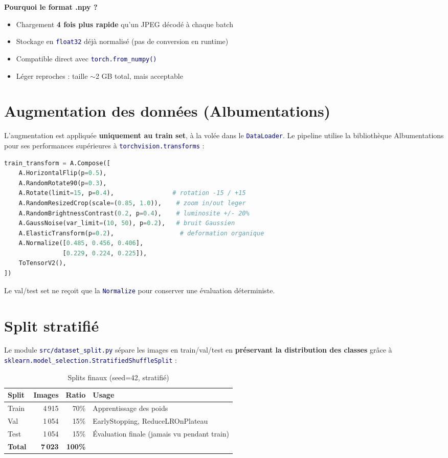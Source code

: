\documentclass[11pt,a4paper,oneside]{report}
\newcommand{\code}[1]{\texttt{\textcolor{navy}{#1}}}
\begin{document}
\textbf{Pourquoi le format .npy ?}
\begin{itemize}
\item Chargement \textbf{4 fois plus rapide} qu'un JPEG décodé à chaque batch
\item Stockage en \code{float32} déjà normalisé (pas de conversion en runtime)
\item Compatible direct avec \code{torch.from\_numpy()}
\item Léger reproches : taille $\sim$2 GB total, mais acceptable
\end{itemize}

\section{Augmentation des données (Albumentations)}

L'augmentation est appliquée \textbf{uniquement au train set}, à la volée dans le \code{DataLoader}. Le pipeline utilise la bibliothèque Albumentations pour ses performances supérieures à \code{torchvision.transforms} :

\begin{lstlisting}[language=Python, caption={Pipeline d'augmentation Albumentations}]
train_transform = A.Compose([
    A.HorizontalFlip(p=0.5),
    A.RandomRotate90(p=0.3),
    A.Rotate(limit=15, p=0.4),                # rotation -15 / +15
    A.RandomResizedCrop(scale=(0.85, 1.0)),    # zoom in/out leger
    A.RandomBrightnessContrast(0.2, p=0.4),    # luminosite +/- 20%
    A.GaussNoise(var_limit=(10, 50), p=0.2),   # bruit Gaussien
    A.ElasticTransform(p=0.2),                  # deformation organique
    A.Normalize([0.485, 0.456, 0.406],
                [0.229, 0.224, 0.225]),
    ToTensorV2(),
])
\end{lstlisting}

Le val/test set ne reçoit que la \code{Normalize} pour conserver une évaluation déterministe.

\section{Split stratifié}

Le module \code{src/dataset\_split.py} sépare les images en train/val/test en \textbf{préservant la distribution des classes} grâce à \code{sklearn.model\_selection.StratifiedShuffleSplit} :

\begin{table}[!htbp]
\centering
\caption{Splits finaux (seed=42, stratifié)}
\begin{tabular}{lrrl}
\toprule
\textbf{Split} & \textbf{Images} & \textbf{Ratio} & \textbf{Usage} \\
\midrule
Train & 4\,915 & 70\% & Apprentissage des poids \\
Val   & 1\,054 & 15\% & EarlyStopping, ReduceLROnPlateau \\
Test  & 1\,054 & 15\% & Évaluation finale (jamais vu pendant train) \\
\midrule
\textbf{Total} & \textbf{7\,023} & \textbf{100\%} & \\
\bottomrule
\end{tabular}
\end{table}
\end{document}

